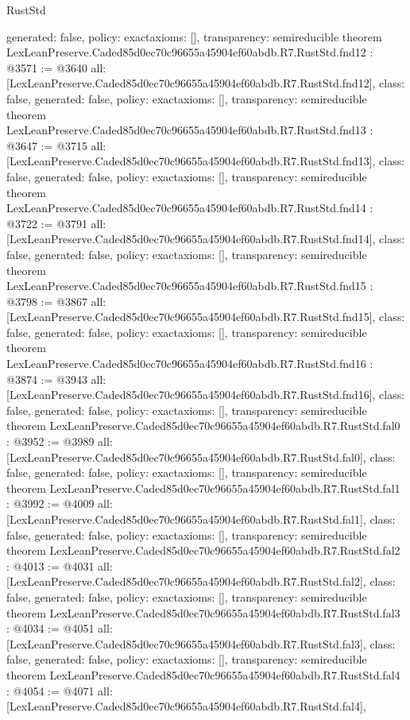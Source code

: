 \begin{lexlean}{RustStd}
\begin{coremodule}
{  generated: false,
  policy: exact{axioms: []},
  transparency: semireducible
}
theorem LexLeanPreserve.Caded85d0ec70c96655a45904ef60abdb.R7.RustStd.fnd12 : @3571 := @3640 {
  all: [LexLeanPreserve.Caded85d0ec70c96655a45904ef60abdb.R7.RustStd.fnd12],
  class: false,
  generated: false,
  policy: exact{axioms: []},
  transparency: semireducible
}
theorem LexLeanPreserve.Caded85d0ec70c96655a45904ef60abdb.R7.RustStd.fnd13 : @3647 := @3715 {
  all: [LexLeanPreserve.Caded85d0ec70c96655a45904ef60abdb.R7.RustStd.fnd13],
  class: false,
  generated: false,
  policy: exact{axioms: []},
  transparency: semireducible
}
theorem LexLeanPreserve.Caded85d0ec70c96655a45904ef60abdb.R7.RustStd.fnd14 : @3722 := @3791 {
  all: [LexLeanPreserve.Caded85d0ec70c96655a45904ef60abdb.R7.RustStd.fnd14],
  class: false,
  generated: false,
  policy: exact{axioms: []},
  transparency: semireducible
}
theorem LexLeanPreserve.Caded85d0ec70c96655a45904ef60abdb.R7.RustStd.fnd15 : @3798 := @3867 {
  all: [LexLeanPreserve.Caded85d0ec70c96655a45904ef60abdb.R7.RustStd.fnd15],
  class: false,
  generated: false,
  policy: exact{axioms: []},
  transparency: semireducible
}
theorem LexLeanPreserve.Caded85d0ec70c96655a45904ef60abdb.R7.RustStd.fnd16 : @3874 := @3943 {
  all: [LexLeanPreserve.Caded85d0ec70c96655a45904ef60abdb.R7.RustStd.fnd16],
  class: false,
  generated: false,
  policy: exact{axioms: []},
  transparency: semireducible
}
theorem LexLeanPreserve.Caded85d0ec70c96655a45904ef60abdb.R7.RustStd.fal0 : @3952 := @3989 {
  all: [LexLeanPreserve.Caded85d0ec70c96655a45904ef60abdb.R7.RustStd.fal0],
  class: false,
  generated: false,
  policy: exact{axioms: []},
  transparency: semireducible
}
theorem LexLeanPreserve.Caded85d0ec70c96655a45904ef60abdb.R7.RustStd.fal1 : @3992 := @4009 {
  all: [LexLeanPreserve.Caded85d0ec70c96655a45904ef60abdb.R7.RustStd.fal1],
  class: false,
  generated: false,
  policy: exact{axioms: []},
  transparency: semireducible
}
theorem LexLeanPreserve.Caded85d0ec70c96655a45904ef60abdb.R7.RustStd.fal2 : @4013 := @4031 {
  all: [LexLeanPreserve.Caded85d0ec70c96655a45904ef60abdb.R7.RustStd.fal2],
  class: false,
  generated: false,
  policy: exact{axioms: []},
  transparency: semireducible
}
theorem LexLeanPreserve.Caded85d0ec70c96655a45904ef60abdb.R7.RustStd.fal3 : @4034 := @4051 {
  all: [LexLeanPreserve.Caded85d0ec70c96655a45904ef60abdb.R7.RustStd.fal3],
  class: false,
  generated: false,
  policy: exact{axioms: []},
  transparency: semireducible
}
theorem LexLeanPreserve.Caded85d0ec70c96655a45904ef60abdb.R7.RustStd.fal4 : @4054 := @4071 {
  all: [LexLeanPreserve.Caded85d0ec70c96655a45904ef60abdb.R7.RustStd.fal4],
}
\end{coremodule}
\end{lexlean}
